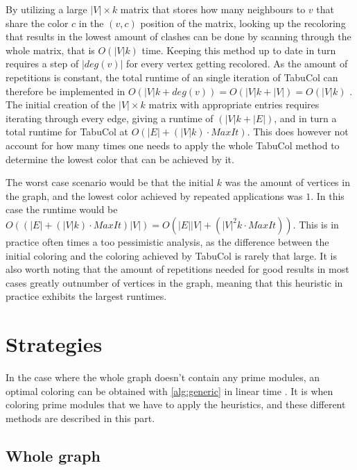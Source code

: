 \documentclass[a4paper]{article}
\begin{document}
By utilizing a large $|V| \times k$ matrix that stores how many neighbours to $v$ that share
the color $c$ in the $(v,c)$ position of the matrix, looking up the recoloring
that results in the lowest amount of clashes can be done by scanning through 
the whole matrix, that is $O(|V|k)$ time.
Keeping this method up to date in turn requires a step of $|deg(v)|$ for every
vertex getting recolored.  As the amount of repetitions is constant, the total
runtime of an single iteration of TabuCol can therefore be implemented in
$O(|V|k+deg(v)) = O(|V|k+|V|) = O(|V|k)$ \cite{Constructive}. The initial
creation of the $|V| \times k$ matrix with appropriate entries requires
iterating through every edge, giving a runtime of $(|V|k+|E|)$, and in turn a 
total runtime for TabuCol at $O(|E|+(|V|k)\cdot MaxIt)$. This does however
not account for how many times one needs to apply the whole TabuCol method to
determine the lowest color that can be achieved by it.

The worst case scenario would be that the initial $k$ was the amount of vertices
in the graph, and the lowest color achieved by repeated applications was $1$. In
this case the runtime would be $O((|E|+(|V|k)\cdot MaxIt)|V|) = O( |E||V| +
(|V|^2k\cdot MaxIt))$. This is in practice often times a too pessimistic
analysis, as the difference between the initial coloring and the coloring
achieved by TabuCol is rarely that large. It is also worth noting that the
amount of repetitions needed for good results in most cases greatly outnumber of
vertices in the graph, meaning that this heuristic in practice exhibits the
largest runtimes.

\section{Strategies}
\label{sec:Strategies}
In the case where the whole graph doesn't contain any prime modules, an optimal
coloring can be obtained with \autoref{alg:generic} in linear time
\cite{HCL}. It is when coloring prime modules that we have to apply the
heuristics, and these different methods are described in this part.

\subsection{Whole graph}
\end{document}
